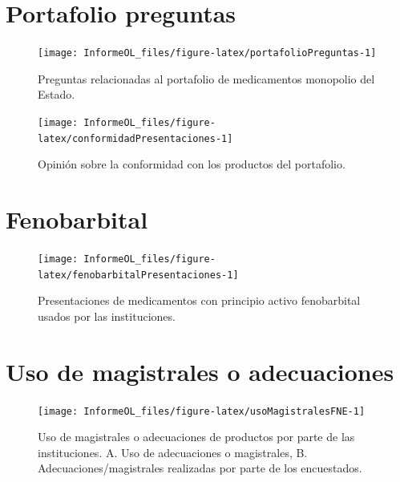 \documentclass[
  oneside]{book}
\begin{document}
\hypertarget{portafolio-preguntas}{%
\section{Portafolio preguntas}\label{portafolio-preguntas}}

\begin{figure}

{\centering \texttt{[image: InformeOL\_files/figure-latex/portafolioPreguntas-1]} 

}

\caption{Preguntas relacionadas al portafolio de medicamentos monopolio del Estado.}\label{fig:portafolioPreguntas}
\end{figure}
\begin{figure}

{\centering \texttt{[image: InformeOL\_files/figure-latex/conformidadPresentaciones-1]} 

}

\caption{Opinión sobre la conformidad con los productos del portafolio.}\label{fig:conformidadPresentaciones}
\end{figure}

\hypertarget{fenobarbital}{%
\section{Fenobarbital}\label{fenobarbital}}

\begin{figure}

{\centering \texttt{[image: InformeOL\_files/figure-latex/fenobarbitalPresentaciones-1]} 

}

\caption{Presentaciones de medicamentos con principio activo fenobarbital usados por las instituciones.}\label{fig:fenobarbitalPresentaciones}
\end{figure}

\hypertarget{uso-de-magistrales-o-adecuaciones}{%
\section{Uso de magistrales o adecuaciones}\label{uso-de-magistrales-o-adecuaciones}}

\begin{figure}

{\centering \texttt{[image: InformeOL\_files/figure-latex/usoMagistralesFNE-1]} 

}

\caption{Uso de magistrales o adecuaciones de productos por parte de las instituciones. A. Uso de adecuaciones o magistrales, B. Adecuaciones/magistrales realizadas por parte de los encuestados.}\label{fig:usoMagistralesFNE}
\end{figure}
\end{document}

